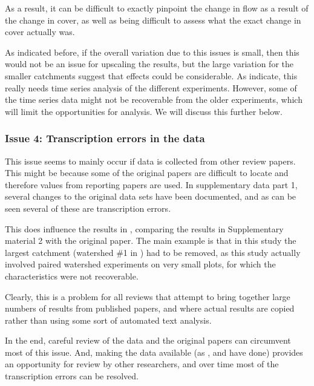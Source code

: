 \documentclass[]{elsarticle} %
\begin{document}
As a result, it can be difficult to exactly pinpoint the change in flow as a result of the change in cover, as well as being difficult to assess what the exact change in cover actually was.

As indicated before, if the overall variation due to this issues is small, then this would not be an issue for upscaling the results, but the large variation for the smaller catchments suggest that effects could be considerable. As \citet{jones2017} indicate, this really needs time series analysis of the different experiments. However, some of the time series data might not be recoverable from the older experiments, which will limit the opportunities for analysis. We will discuss this further below.

\hypertarget{issue-4-transcription-errors-in-the-data}{%
\subsubsection{Issue 4: Transcription errors in the data}\label{issue-4-transcription-errors-in-the-data}}

This issue seems to mainly occur if data is collected from other review papers. This might be because some of the original papers are difficult to locate and therefore values from reporting papers are used. In supplementary data part 1, several changes to the original data sets have been documented, and as can be seen several of these are transcription errors.

This does influence the results in \citet{zhang2017}, comparing the results in Supplementary material 2 with the original paper. The main example is that in this study the largest catchment (watershed \#1 in \citet{zhang2017}) had to be removed, as this study actually involved paired watershed experiments on very small plots, for which the characteristics were not recoverable.

Clearly, this is a problem for all reviews that attempt to bring together large numbers of results from published papers, and where actual results are copied rather than using some sort of automated text analysis.

In the end, careful review of the data and the original papers can circumvent most of this issue. And, making the data available (as \citet{zhang2017}, \citet{zhou2015} and \citet{filoso2017} have done) provides an opportunity for review by other researchers, and over time most of the transcription errors can be resolved.
\end{document}

